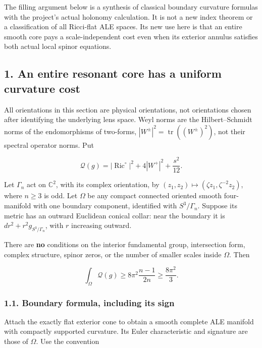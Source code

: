 \documentclass[
  10pt,
]{article}
\begin{document}
The filling argument below is a synthesis of classical boundary
curvature formulas with the project's actual holonomy calculation. It is
not a new index theorem or a classification of all Ricci-flat ALE
spaces. Its new use here is that an entire smooth core pays a
scale-independent cost even when its exterior annulus satisfies both
actual local spinor equations.

\hypertarget{an-entire-resonant-core-has-a-uniform-curvature-cost}{%
\subsection{1. An entire resonant core has a uniform curvature
cost}\label{an-entire-resonant-core-has-a-uniform-curvature-cost}}

All orientations in this section are physical orientations, not
orientations chosen after identifying the underlying lens space. Weyl
norms are the Hilbert--Schmidt norms of the endomorphisms of two-forms,
\(|W^\pm|^2=\operatorname{tr}((W^\pm)^2)\), not their spectral operator
norms. Put

\[
 \mathscr Q(g)=|\operatorname{Ric}^{\circ}|^2
                       +4|W^+|^2+\frac{s^2}{12}.
                                                        \tag{1.1}
\]

Let \(\Gamma_n\) act on \(\mathbb C^2\), with its complex orientation,
by \((z_1,z_2)\mapsto(\zeta z_1,\zeta^{-2}z_2)\), where \(n\ge3\) is
odd. Let \(\Omega\) be any compact connected oriented smooth
four-manifold with one boundary component, identified with
\(S^3/\Gamma_n\). Suppose its metric has an outward Euclidean conical
collar: near the boundary it is \(dr^2+r^2g_{S^3/\Gamma_n}\), with \(r\)
increasing outward.

There are \textbf{no} conditions on the interior fundamental group,
intersection form, complex structure, spinor zeros, or the number of
smaller scales inside \(\Omega\). Then

\[
 \boxed{\int_\Omega\mathscr Q(g)\ge
              8\pi^2\frac{n-1}{2n}\ge\frac{8\pi^2}{3}.}
                                                        \tag{1.2}
\]

\hypertarget{boundary-formula-including-its-sign}{%
\subsubsection{1.1. Boundary formula, including its
sign}\label{boundary-formula-including-its-sign}}

Attach the exactly flat exterior cone to obtain a smooth complete ALE
manifold with compactly supported curvature. Its Euler characteristic
and signature are those of \(\Omega\). Use the convention
\end{document}
